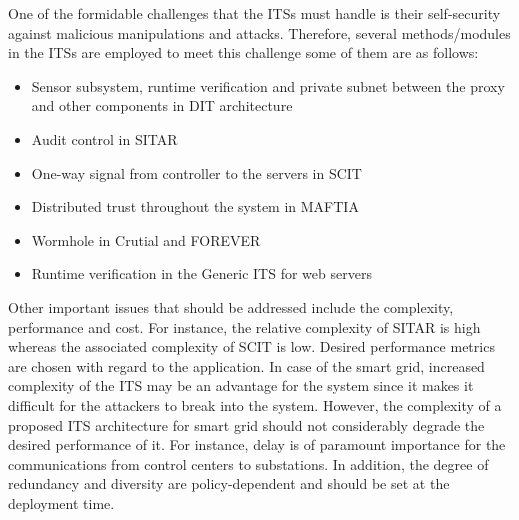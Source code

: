 \documentclass[preprint,number,12pt]{elsarticle}
\begin{document}
One of the formidable challenges that the ITSs must handle is their self-security against malicious manipulations and attacks. Therefore, several methods/modules in the ITSs are employed to meet this challenge some of them are as follows:
\begin{itemize}
\item Sensor subsystem, runtime verification and private subnet between the proxy and other components in DIT architecture
\item Audit control in SITAR
\item One-way signal from controller to the servers in SCIT
\item Distributed trust throughout the system in MAFTIA
\item Wormhole in Crutial and FOREVER
\item Runtime verification in the Generic ITS for web servers
\end{itemize}

Other important issues that should be addressed include the complexity, performance and cost. For instance, the relative complexity of SITAR is high whereas the associated complexity of SCIT is low\citep{Nguyen201124}. Desired performance metrics are chosen with regard to the application. In case of the smart grid, increased complexity of the ITS may be an advantage for the system since it makes it difficult for the attackers to break into the system. However, the complexity of a proposed ITS architecture for smart grid should not considerably degrade the desired performance of it. For instance, delay is of paramount importance for the communications from control centers to substations\citep{Wei2011c}. In addition, the degree of redundancy and diversity are policy-dependent and should be set at the deployment time.
\end{document}
